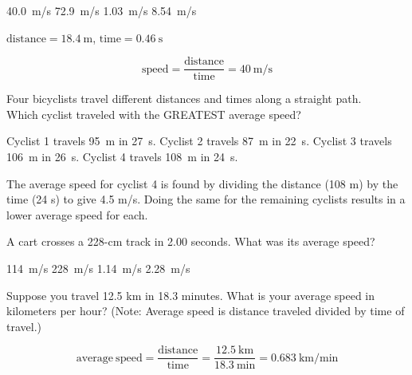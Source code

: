 \documentclass[]{exam}
\begin{document}
\begin{questions}
\begin{questions}
\begin{choices}
\correctchoice \SI{40.0}{m/s}
\choice \SI{72.9}{m/s}
\choice \SI{1.03}{m/s}
\choice \SI{8.54}{m/s}
\end{choices}

\begin{solution}
    $\text{distance} = \SI{18.4}{\meter}$, $\text{time}=\SI{0.46}{\second}$

\begin{equation*}
    \text{speed} = \frac{\text{distance}}{\text{time}} = \SI{40}{\meter/\second}
\end{equation*}
\end{solution}

\question
Four bicyclists travel different distances and times along a straight path. \\
Which cyclist traveled with the GREATEST average speed?

\begin{choices}
\choice Cyclist 1 travels \SI{95}{m} in \SI{27}{s}.
\choice Cyclist 2 travels \SI{87}{m} in \SI{22}{s}.
\choice Cyclist 3 travels \SI{106}{m} in \SI{26}{s}.
\CorrectChoice Cyclist 4 travels \SI{108}{m} in \SI{24}{s}.
\end{choices}

\begin{solution}
The average speed for cyclist 4 is found by dividing the distance (108 m) by the time (24 s) to give 4.5 m/s. Doing the same for the remaining cyclists results in a lower average speed for each.
\end{solution}


\question
A cart crosses a 228-cm track in 2.00 seconds. What was its average speed?

\begin{choices}
    \choice \SI{114}{m/s}
    \choice \SI{228}{m/s}
    \correctchoice \SI{1.14}{m/s}
    \choice \SI{2.28}{m/s}
\end{choices}

\question
Suppose you travel 12.5 km in 18.3 minutes. What is your average speed in kilometers per hour? (Note: Average speed is distance traveled divided by time of travel.)

\begin{solution}
\begin{equation*}
    \mathrm{average\ speed = \frac{distance}{time}} = \frac{\SI{12.5}{\kilo\meter}}{\SI{18.3}{\minute}} = \SI[per-mode=fraction]{0.683}{\kilo\meter\per\minute}
\end{equation*}


\end{solution}
\end{questions}
\end{questions}
\end{document}
